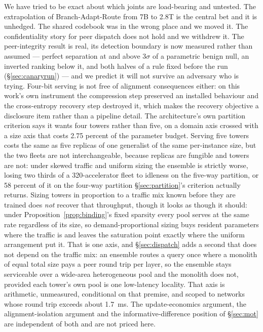 \documentclass[11pt]{article}
\begin{document}
We have tried to be exact about which joints are load-bearing and untested. The extrapolation of Branch-Adapt-Route from 7B to 2.8T is the central bet and it is unhedged. The shared codebook was in the wrong place and we moved it. The confidentiality story for peer dispatch does not hold and we withdrew it. The peer-integrity result is real, its detection boundary is now measured rather than assumed --- perfect separation at and above $3\sigma$ of a parametric benign null, an inverted ranking below it, and both halves of a rule fixed before the run (\S\ref{sec:canaryrun}) --- and we predict it will not survive an adversary who is trying. Four-bit serving is not free of alignment consequences either: on this work's own instrument the compression step preserved an installed behaviour and the cross-entropy recovery step destroyed it, which makes the recovery objective a disclosure item rather than a pipeline detail. The architecture's own partition criterion says it wants four towers rather than five, on a domain axis crossed with a size axis that costs 2.75 percent of the parameter budget. Serving five towers costs the same as five replicas of one generalist of the same per-instance size, but the two fleets are not interchangeable, because replicas are fungible and towers are not: under skewed traffic and uniform sizing the ensemble is strictly worse, losing two thirds of a 320-accelerator fleet to idleness on the five-way partition, or 58 percent of it on the four-way partition \S\ref{sec:partition}'s criterion actually returns. Sizing towers in proportion to a traffic mix known before they are trained does \emph{not} recover that throughput, though it looks as though it should: under Proposition~\ref{prop:binding}'s fixed sparsity every pool serves at the same rate regardless of its size, so demand-proportional sizing buys resident parameters where the traffic is and leaves the saturation point exactly where the uniform arrangement put it. That is one axis, and \S\ref{sec:dispatch} adds a second that does not depend on the traffic mix: an ensemble routes a query once where a monolith of equal total size pays a peer round trip per layer, so the ensemble stays serviceable over a wide-area heterogeneous pool and the monolith does not, provided each tower's own pool is one low-latency locality. That axis is arithmetic, unmeasured, conditional on that premise, and scoped to networks whose round trip exceeds about 1.7~ms. The update-economics argument, the alignment-isolation argument and the informative-difference position of \S\ref{sec:mot} are independent of both and are not priced here.
\end{document}
